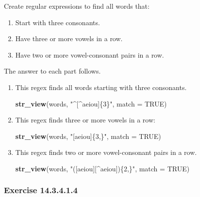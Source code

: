 \documentclass[]{book}
\newenvironment{Shaded}{\begin{snugshade}}{\end{snugshade}}
\newcommand{\DataTypeTok}[1]{\textcolor[rgb]{0.13,0.29,0.53}{#1}}
\newcommand{\KeywordTok}[1]{\textcolor[rgb]{0.13,0.29,0.53}{\textbf{#1}}}
\newcommand{\NormalTok}[1]{#1}
\newcommand{\OtherTok}[1]{\textcolor[rgb]{0.56,0.35,0.01}{#1}}
\newcommand{\StringTok}[1]{\textcolor[rgb]{0.31,0.60,0.02}{#1}}
\providecommand{\tightlist}{%
  \setlength{\itemsep}{0pt}\setlength{\parskip}{0pt}}
\theoremstyle{plain}
\theoremstyle{remark}
\begin{document}
Create regular expressions to find all words that:

\begin{enumerate}
\def\labelenumi{\arabic{enumi}.}
\tightlist
\item
  Start with three consonants.
\item
  Have three or more vowels in a row.
\item
  Have two or more vowel-consonant pairs in a row.
\end{enumerate}

The answer to each part follows.

\begin{enumerate}
\def\labelenumi{\arabic{enumi}.}
\item
  This regex finds all words starting with three consonants.

\begin{Shaded}
\begin{Highlighting}[]
\KeywordTok{str_view}\NormalTok{(words, }\StringTok{"^[^aeiou]\{3\}"}\NormalTok{, }\DataTypeTok{match =} \OtherTok{TRUE}\NormalTok{)}
\end{Highlighting}
\end{Shaded}
\item
  This regex finds three or more vowels in a row:

\begin{Shaded}
\begin{Highlighting}[]
\KeywordTok{str_view}\NormalTok{(words, }\StringTok{"[aeiou]\{3,\}"}\NormalTok{, }\DataTypeTok{match =} \OtherTok{TRUE}\NormalTok{)}
\end{Highlighting}
\end{Shaded}
\item
  This regex finds two or more vowel-consonant pairs in a row.

\begin{Shaded}
\begin{Highlighting}[]
\KeywordTok{str_view}\NormalTok{(words, }\StringTok{"([aeiou][^aeiou])\{2,\}"}\NormalTok{, }\DataTypeTok{match =} \OtherTok{TRUE}\NormalTok{)}
\end{Highlighting}
\end{Shaded}
\end{enumerate}

\hypertarget{exercise-14.3.4.1.4}{%
\subsubsection*{\texorpdfstring{Exercise
{14.3.4.1.4}}{Exercise 14.3.4.1.4}}\label{exercise-14.3.4.1.4}}
\end{document}
